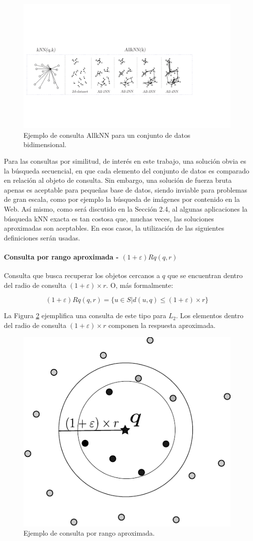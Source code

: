 \begin{figure}[ht]
\centering
 \includegraphics[width=0.85\columnwidth]{images/knnGraph.pdf}
\caption{Ejemplo  de consulta AllkNN para un conjunto de datos bidimensional.}
\label{fig:knn_allknn}
\end{figure}

Para las consultas por similitud, de interés en este trabajo, una solución obvia es la búsqueda secuencial, en que cada elemento del conjunto de datos es comparado en relación al objeto de consulta. Sin embargo, una solución de fuerza bruta apenas es aceptable para pequeñas base de datos, siendo inviable para problemas de gran escala, como por ejemplo la búsqueda de imágenes por contenido en la Web. Así mismo, como será discutido en la Sección 2.4, al algunas aplicaciones la búsqueda kNN exacta es tan costosa que, muchas veces, las soluciones aproximadas son aceptables. En esos casos, la utilización de las siguientes definiciones serán usadas.


\paragraph{Consulta por rango aproximada - $(1 + \varepsilon)  Rq(q, r)$}

Consulta que busca recuperar los objetos cercanos a $q$ que se encuentran dentro del radio de consulta  $(1 + \varepsilon) \times r$. O, más formalmente:

\begin{equation}
    (1 + \varepsilon) Rq(q, r) = \{ u \in S | d(u, q) \leq (1 + \varepsilon) \times r \}
\end{equation}

La Figura \ref{fig:AproximateRangeQuery} ejemplifica una consulta de este tipo para $L_2$. Los elementos dentro del radio de consulta  $(1 + \varepsilon)\times r$ componen la respuesta aproximada.
\begin{figure}[htp]
\centering
\includegraphics[width=0.32\columnwidth]{images/app-range_query.pdf}
\caption{Ejemplo de consulta  por  rango aproximada.}
\label{fig:AproximateRangeQuery}
\end{figure}


